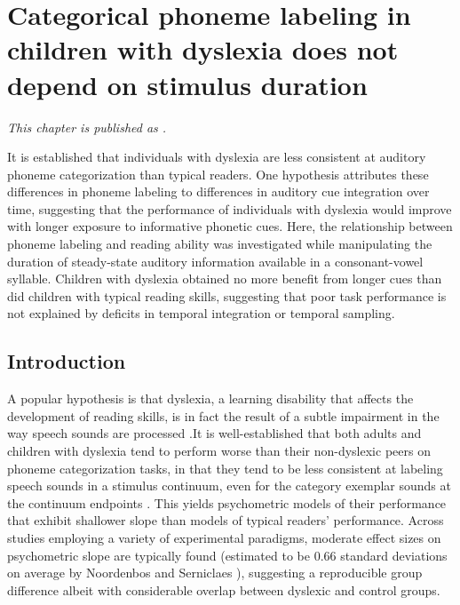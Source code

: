 \documentclass[../uwthesis.tex]{subfiles}
\begin{document}
\chapter{Categorical phoneme labeling in children with dyslexia does not depend on stimulus duration}
\emph{This chapter is published as \cite{OBrien2019CategoricalDuration}.}


It is established that individuals with dyslexia are less consistent at auditory phoneme categorization than typical readers. One hypothesis attributes these differences in phoneme labeling to differences in auditory cue integration over time, suggesting that the performance of individuals with dyslexia would improve with longer exposure to informative phonetic cues. Here, the relationship between phoneme labeling and reading ability was investigated while manipulating the duration of steady-state auditory information available in a consonant-vowel syllable. Children with dyslexia obtained no more benefit from longer cues than did children with typical reading skills, suggesting that poor task performance is not explained by deficits in temporal integration or temporal sampling.

\section{Introduction}
A popular hypothesis is that dyslexia, a learning disability that affects the development of reading skills, is in fact the result of a subtle impairment in the way speech sounds are processed \cite{Farmer1995,VanIngelghem2005,Poelmans2011,Tallal1980}.It is well-established that both adults and children with dyslexia tend to perform worse than their non-dyslexic peers on phoneme categorization tasks, in that they tend to be less consistent at labeling speech sounds in a stimulus continuum, even for the category exemplar sounds at the continuum endpoints \cite{Brandt1980,Hakvoort2016,OBrien2018,Serniclaes2004,Zhang2012}. This yields psychometric models of their performance that exhibit shallower slope than models of typical readers' performance. Across studies employing a variety of experimental paradigms, moderate effect sizes on psychometric slope are typically found (estimated to be 0.66 standard deviations on average by Noordenbos and Serniclaes \cite{Noordenbos2015}), suggesting a reproducible group difference albeit with considerable overlap between dyslexic and control groups.
\end{document}
